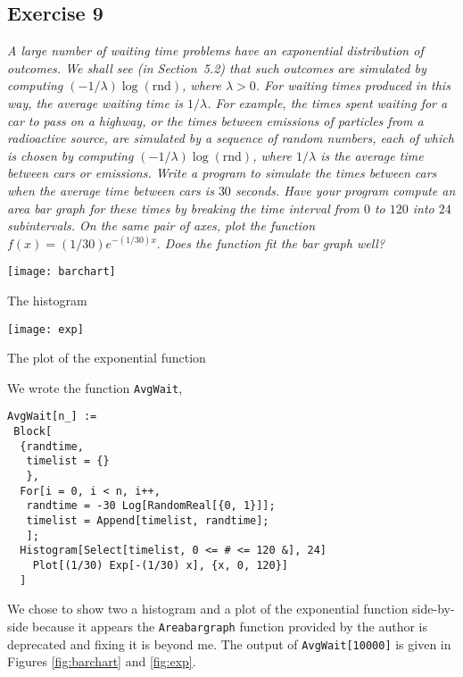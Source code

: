 \documentclass{tufte-handout}
\begin{document}
\subsection{Exercise 9}
\begin{description}
\item \textit{A large number of waiting time problems have an
    exponential distribution of outcomes. We shall see (in
    Section~5.2) that such outcomes are simulated by computing
    $(-1/\lambda)\log{(\mathrm{rnd})}$, where $\lambda > 0$. For
    waiting times produced in this way, the average waiting time is
    $1/\lambda$. For example, the times spent waiting for a car to
    pass on a highway, or the times between emissions of particles
    from a radioactive source, are simulated by a sequence of random
    numbers, each of which is chosen by computing
    $(-1/\lambda)\log{(\mathrm{rnd})}$, where $1/\lambda$ is the
    average time between cars or emissions. Write a program to
    simulate the times between cars when the average time between cars
    is $30$ seconds. Have your program compute an area bar graph for
    these times by breaking the time interval from $0$ to $120$ into
    $24$ subintervals. On the same pair of axes, plot the function
    $f(x) = (1/30)e^{-(1/30)x}.$ Does the function fit the bar graph
    well?}
\end{description}

\begin{marginfigure}[3cm]
  \centering
  \texttt{[image: barchart]}
  \caption{The histogram}
  \label{fig:barchart}
\end{marginfigure}

\begin{marginfigure}
  \texttt{[image: exp]}
  \caption{The plot of the exponential function}
  \label{fig:exp}
\end{marginfigure}

We wrote the function \lstinline$AvgWait$,

\begin{lstlisting}
AvgWait[n_] :=
 Block[
  {randtime,
   timelist = {}
   },
  For[i = 0, i < n, i++,
   randtime = -30 Log[RandomReal[{0, 1}]];
   timelist = Append[timelist, randtime];
   ];
  Histogram[Select[timelist, 0 <= # <= 120 &], 24]
    Plot[(1/30) Exp[-(1/30) x], {x, 0, 120}]
  ]
\end{lstlisting}
We chose to show two a histogram and a plot of the exponential
function side-by-side because it appears the \lstinline$Areabargraph$
function provided by the author is deprecated and fixing it is beyond
me. The output of \lstinline$AvgWait[10000]$ is given in Figures
\ref{fig:barchart} and \ref{fig:exp}.
\end{document}
